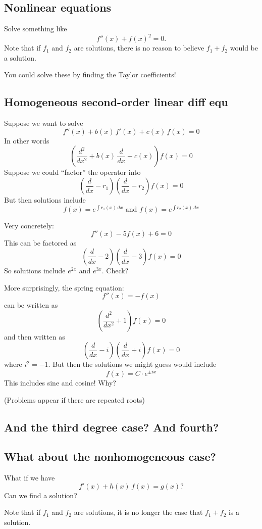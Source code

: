 \documentclass[12pt]{article}
\begin{document}
\subsection*{Nonlinear equations}

Solve something like
$$
f''(x) + f(x)^2 = 0.
$$
Note that if $f_1$ and $f_2$ are solutions, there is no reason to
believe $f_1 + f_2$ would be a solution.

You could solve these by finding the Taylor coefficients!

\subsection*{Homogeneous second-order linear diff equ}

Suppose we want to solve
$$
f''(x) + b(x) \, f'(x) + c(x) \, f(x) = 0
$$
In other words
$$
\left( \frac{d^2}{dx^2} + b(x) \, \frac{d}{dx} + c(x) \right) f(x) = 0
$$
Suppose we could ``factor'' the operator into
$$
\left( \frac{d}{dx} - r_1 \right) \left( \frac{d}{dx} - r_2 \right) f(x) = 0
$$
But then solutions include
$$
f(x) = e^{\int r_1(x) \, dx} \mbox{ and } f(x) = e^{\int r_2(x) \, dx}
$$

Very concretely: 
$$
f''(x) - 5f(x) + 6 = 0
$$
This can be factored as
$$
\left( \frac{d}{dx} - 2 \right) \left( \frac{d}{dx} - 3 \right) f(x) = 0
$$
So solutions include $e^{2x}$ and $e^{3x}$.  Check?

More surprisingly, the spring equation:
$$
f''(x) = -f(x)
$$
can be written as
$$
\left( \frac{d^2}{dx^2} + 1 \right) f(x) = 0
$$
and then written as
$$
\left( \frac{d}{dx} - i \right) \left( \frac{d}{dx} + i \right) f(x) = 0
$$
where $i^2 = -1$.  But then the solutions we might guess would include
$$
f(x) = C \cdot e^{\pm ix}
$$
This includes sine and cosine!  Why?

(Problems appear if there are repeated roots)

\subsection*{And the third degree case?  And fourth?}

\subsection*{What about the nonhomogeneous case?}

What if we have
$$
f'(x) + h(x) \, f(x) = g(x)?
$$
Can we find a solution?

Note that if $f_1$ and $f_2$ are solutions, it is no longer the case
that $f_1 + f_2$ is a solution.
\end{document}
